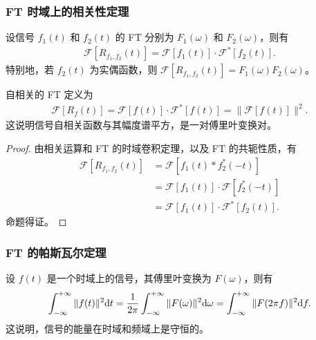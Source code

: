 \subsubsection{FT 时域上的相关性定理}

\begin{theorem}
    设信号 $f_1(t)$ 和 $f_2(t)$ 的 FT 分别为 $F_1(\omega)$ 和 $F_2(\omega)$，则有
    \begin{align*}
        \mathcal{F}[R_{f_1, f_2}(t)] = \mathcal{F}[f_1(t)] \cdot \mathcal{F}^*[f_2(t)].
    \end{align*}
    特别地，若 $f_2(t)$ 为实偶函数，则 $\mathcal{F}[R_{f_1, f_2}(t)] = F_1(\omega)F_2(\omega)$。

    自相关的 FT 定义为
    \begin{align*}
        \mathcal{F}[R_f(t)] = \mathcal{F}[f(t)] \cdot \mathcal{F}^*[f(t)] = \|\mathcal{F}[f(t)]\|^2.
    \end{align*}
    这说明信号自相关函数与其幅度谱平方，是一对傅里叶变换对。
\end{theorem}

\begin{proof}
    由相关运算和 FT 的时域卷积定理，以及 FT 的共轭性质，有
    \begin{align*}
        \mathcal{F}[R_{f_1, f_2}(t)] & = \mathcal{F}[f_1(t) * f_2^*(-t)] \\
        & = \mathcal{F}[f_1(t)] \cdot \mathcal{F}[f_2^*(-t)] \\
        & = \mathcal{F}[f_1(t)] \cdot \mathcal{F}^*[f_2(t)].
    \end{align*}
    命题得证。
\end{proof}

\subsubsection{FT 的帕斯瓦尔定理}

\begin{theorem}
    设 $f(t)$ 是一个时域上的信号，其傅里叶变换为 $F(\omega)$，则有
    \begin{align*}
        \int_{-\infty}^{+\infty} \|f(t)\|^2 \mathrm{d}t
        = \frac{1}{2\pi}\int_{-\infty}^{+\infty} \|F(\omega)\|^2 \mathrm{d}\omega
        = \int_{-\infty}^{+\infty}\|F(2\pi f)\|^2 \mathrm{d}f.
    \end{align*}
    这说明，信号的能量在时域和频域上是守恒的。
\end{theorem}
